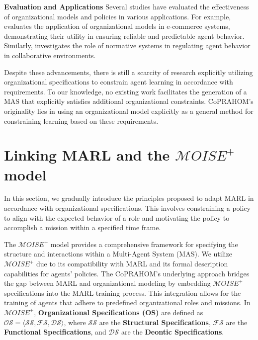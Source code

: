 \documentclass[conference]{IEEEtran}
\begin{document}
\textbf{Evaluation and Applications} \quad
Several studies have evaluated the effectiveness of organizational models and policies in various applications. For example, \cite{dignum2004agent} evaluates the application of organizational models in e-commerce systems, demonstrating their utility in ensuring reliable and predictable agent behavior. Similarly, \cite{andrighetto2013normative} investigates the role of normative systems in regulating agent behavior in collaborative environments.

Despite these advancements, there is still a scarcity of research explicitly utilizing organizational specifications to constrain agent learning in accordance with requirements. To our knowledge, no existing work facilitates the generation of a MAS that explicitly satisfies additional organizational constraints. CoPRAHOM's originality lies in using an organizational model explicitly as a general method for constraining learning based on these requirements.


\section{Linking MARL and the $\mathcal{M}OISE^+$ model}\label{sec:linking_marl_moise}
\label{sec:marl_moise_linking}

In this section, we gradually introduce the principles proposed to adapt MARL in accordance with organizational specifications. This involves constraining a policy to align with the expected behavior of a role and motivating the policy to accomplish a mission within a specified time frame.

The $\mathcal{M}OISE^+$ model provides a comprehensive framework for specifying the structure and interactions within a Multi-Agent System (MAS). We utilize $\mathcal{M}OISE^+$ due to its compatibility with MARL and its formal description capabilities for agents' policies. The CoPRAHOM's underlying approach bridges the gap between MARL and organizational modeling by embedding $\mathcal{M}OISE^+$ specifications into the MARL training process. This integration allows for the training of agents that adhere to predefined organizational roles and missions.
%
In $\mathcal{M}OISE^+$, \textbf{Organizational Specifications (OS)} are defined as $\mathcal{OS} = \langle \mathcal{SS}, \mathcal{FS}, \mathcal{DS} \rangle$, where $\mathcal{SS}$ are the \textbf{Structural Specifications}, $\mathcal{FS}$ are the \textbf{Functional Specifications}, and $\mathcal{DS}$ are the \textbf{Deontic Specifications}.
\end{document}

